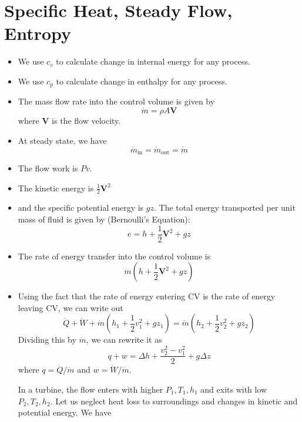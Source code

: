 \section{Specific Heat, Steady Flow, Entropy}
\begin{itemize}
    \item We use $c_v$ to calculate change in internal energy for any process.
    \item We use $c_p$ to calculate change in enthalpy for any process.
    \item The mass flow rate into the control volume is given by 
    \begin{equation}
        \dot{m} = \rho A \bm{V}
    \end{equation}
    where $\bm{V}$ is the flow velocity.
    \item At steady state, we have 
    \begin{equation}
        \dot{m}_\text{in} = \dot{m}_\text{out} = \dot{m}
    \end{equation}
    \item The flow work is $Pv$.
    \item The kinetic energy is $\frac{1}{2}\bm{V}^2$
    \item and the specific potential energy is $gz$. The total energy transported per unit mass of fluid is given by (Bernoulli's Equation):
    \begin{equation}
        e = h + \frac{1}{2}\bm{V}^2 + gz
    \end{equation}
    \item The rate of energy transfer into the control volume is 
    \begin{equation}
        \dot{m}\left(h + \frac{1}{2}\bm{V}^2 + gz\right)
    \end{equation}
    \item Using the fact that the rate of energy entering CV is the rate of energy leaving CV, we can write out
    \begin{equation}
        \dot{Q} + \dot{W} + \dot{m}(h_1+\frac{1}{2}v_1^2+gz_1)=\dot{m}(h_2+\frac{1}{2}v_2^2+gz_2)
    \end{equation}
    Dividing this by $\dot{m}$, we can rewrite it as 
    \begin{equation}
        q+w = \Delta h + \frac{v_2^2-v_1^2}{2}+g\Delta z
    \end{equation}
    where $q=\dot{Q}/\dot{m}$ and $w=\dot{W}/\dot{m}$.
    \begin{example}
        In a turbine, the flow enters with higher $P_1,T_1,h_1$ and exits with low $P_2,T_2,h_2$.  Let us neglect heat loss to surroundings and changes in kinetic and potential energy. We have 

\end{example}
\end{itemize}
